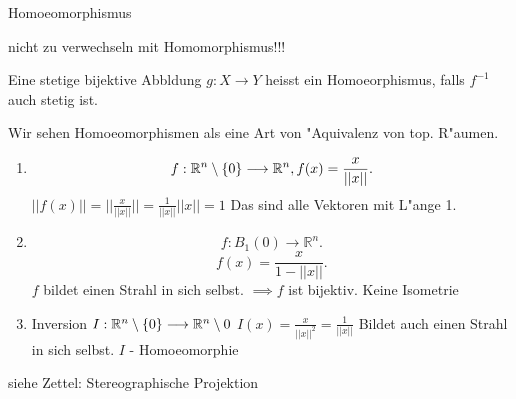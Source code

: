 \documentclass[class=article, crop=false]{standalone}
\begin{document}
\begin{zettel}{Homoeomorphismus}
\begin{flashcard}[]{}
	nicht zu verwechseln mit Homomorphismus!!!
	\begin{definition}[Homoeomorphismus]
		Eine stetige bijektive Abbldung $g:X \longrightarrow Y$  heisst ein Homoeorphismus, falls $f^{-1} $  auch stetig ist.
		\begin{remark}
			Wir sehen Homoeomorphismen als eine Art von "Aquivalenz von top. R"aumen.
		\end{remark}
	\end{definition}

	\begin{example}
		\begin{enumerate}
			\item \[
				      f: \mathbb{R}^n \setminus \set{0} \longrightarrow  \mathbb{R}^n , f(x) =  \frac{x}{ ||x||}
			      .\]
			      $ ||f(x)|| = ||\frac{x}{||x||}|| = \frac{1}{ ||x||} ||x|| = 1 $
			      Das sind alle Vektoren mit L"ange 1.
			\item \[
				      f: B_1 (0) \longrightarrow \mathbb{R}^n
			      .\]
			      \[
				      f(x) =  \frac{x}{1 - ||x||}
			      .\]
			      $f$ bildet einen Strahl in sich selbst. $\implies f$ ist bijektiv. Keine Isometrie

			\item Inversion $I: \mathbb{R}^n \setminus \set{0} \longrightarrow  \R^n \setminus 0$  \quad $I(x) = \frac{x}{ ||x||^2 } = \frac{1}{ ||x||}  $ Bildet auch einen Strahl in sich selbst. $I$ - Homoeomorphie
		\end{enumerate}
	\end{example}

	\begin{example}
		siehe Zettel: Stereographische Projektion
	\end{example}

\end{flashcard}
\end{zettel}
\end{document}
